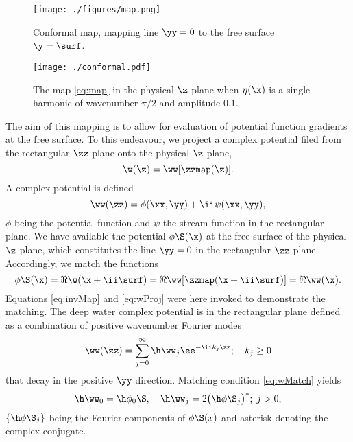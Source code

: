 \begin{figure}[h!ptb]%
\center
\texttt{[image: ./figures/map.png]}%
\caption{Conformal map, mapping line $\yy=0$ to the free surface $\y=\surf$.}%
\label{fig:map}%
\end{figure}
\begin{figure}[h!ptb]%
\centering
\texttt{[image: ./conformal.pdf]}%
\caption{The map \eqref{eq:map} in the physical $\z$-plane when $\eta(\x)$ is a single harmonic of wavenumber $\pi/2$ and amplitude $0.1$.}%
\label{fig:mapReg}%
\end{figure}

The aim of this mapping is to allow for evaluation of potential function gradients at the free surface. 
To this endeavour, we project a complex potential filed from the rectangular $\zz$-plane onto the physical $\z$-plane,
\begin{equation}
\w(\z) = \ww[\zzmap(\z)].
\label{eq:wProj}
\end{equation}
A complex potential is defined
\[ \ww(\zz) = \phi(\xx,\yy) + \ii \psi(\xx,\yy), \]
$\phi$ being the potential function and $\psi$ the stream function in the rectangular plane.
We have available the potential $\phi\S(\x)$ at the free surface of the physical $\z$-plane, which constitutes the line $\yy=0$ in the rectangular  $\zz$-plane. 
Accordingly, we match the functions
\begin{equation}
\phi\S(\x) = \Re \w(\x+\ii\surf) = \Re \ww[\zzmap(\x+\ii\surf)] = \Re \ww(\x).
\label{eq:wMatch}
\end{equation}
Equations \eqref{eq:invMap} and \eqref{eq:wProj} were here invoked to demonstrate the matching.
The deep water
 complex potential is in the rectangular plane defined as a combination of positive wavenumber Fourier modes
\begin{equation}
\ww(\zz) = \sum_{j=0}^\infty \h\ww_j \ee^{-\ii k_j \zz}; \quad k_j\geq 0
\label{eq:w}
\end{equation} 
that decay in the positive $\yy$ direction.
Matching condition \eqref{eq:wMatch} yields
\begin{equation}
\h\ww_0 = \h\phi_0\S, \quad \h\ww_j = 2\big(\h\phi\S_j\big)^*;\; j>0, 
\label{eq:aj}
\end{equation}
$\{\h\phi\S_j\}$ being the Fourier components of $\phi\S(x)$ and asterisk denoting the complex conjugate.

